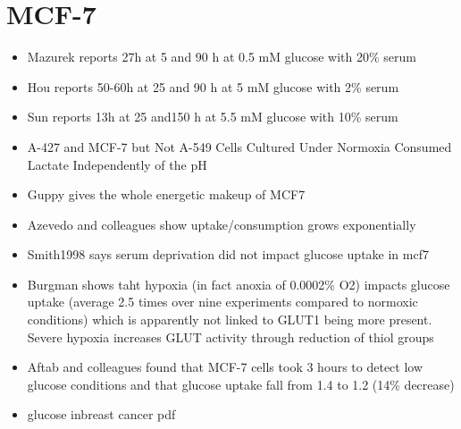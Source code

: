 \documentclass[11pt,a4paper]{article}
\begin{document}
\section{MCF-7}
\begin{itemize}
\item Mazurek reports 27h at 5 and 90 h at 0.5 mM glucose with 20\% serum \cite{Mazurek1997}

\item Hou reports 50-60h at 25 and 90 h at 5 mM glucose with 2\% serum \cite{Hou2017}

\item Sun reports 13h at 25 and150 h at 5.5 mM glucose with 10\% serum \cite{SunS2019}

\item A-427 and MCF-7 but Not A-549 Cells Cultured Under Normoxia Consumed Lactate Independently of the pH \cite{Romero-Garcia2019}

\item Guppy gives the whole energetic makeup of MCF7 \cite{Guppy2002}

\item Azevedo and colleagues show uptake/consumption grows exponentially \cite{Azevedo2015}

\item Smith1998 says serum deprivation did not impact glucose uptake in mcf7 \cite{Smith1998}

\item Burgman shows taht hypoxia (in fact anoxia of 0.0002\% O2) impacts glucose uptake (average 2.5 times over nine experiments compared to normoxic conditions) which is apparently not linked to GLUT1 being more present. Severe hypoxia increases GLUT activity through reduction of thiol groups \cite{Burgman2001}

\item Aftab and colleagues found that MCF-7 cells took 3 hours to detect low glucose conditions and that glucose uptake fall from 1.4 to 1.2 (14\% decrease)

\item glucose inbreast cancer pdf \cite{Shin2021}
\end{itemize}
\end{document}
